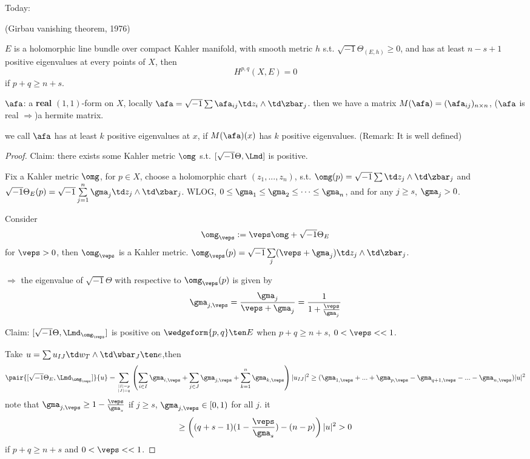 Today:
\begin{thm}(Girbau vanishing theorem, 1976)

$E$ is a holomorphic line bundle over compact Kahler manifold,
with smooth metric $h$ s.t. $\sqrt{-1}\Theta_{(E,h)}\geq 0$,
and has at least $n-s+1$ positive eigenvalues at every points of $X$, then
$$H^{p,q}(X,E)=0$$
if $p+q\geq n+s$.
\end{thm}

$\afa$: a \textbf{real} $(1,1)$-form on $X$,
locally $\afa=\sqrt{-1}\sum\afa_{ij}\td z_i\wedge\td\zbar_j$.
then we have a matrix $M(\afa)=(\afa_{ij})_{n\times n}$,
($\afa$ is real $\Rightarrow$)a hermite matrix.

we call $\afa$ has at least $k$ positive eigenvalues at $x$,
if $M(\afa)(x)$ has $k$ positive eigenvalues.
(Remark: It is well defined)

\begin{proof}
Claim: there exists some Kahler metric $\omg$
s.t. $[\sqrt{-1}\Theta,\Lmd]$ is positive.

Fix a Kahler metric $\omg$,
for $p\in X$, choose a holomorphic chart $(z_1,...,z_n)$,
s.t. $\omg(p)=\sqrt{-1}\sum\td z_j\wedge\td\zbar_j$ and
$\sqrt{-1}\Theta_E(p)=\sqrt{-1}\sum\limits_{j=1}^{n}\gma_j\td z_j\wedge\td\zbar_j$.
WLOG, $0\leq\gma_1\leq\gma_2\leq\cdots\leq\gma_n$,
and for any $j\geq s$, $\gma_j>0$.

Consider
$$\omg_\veps:=\veps\omg+\sqrt{-1}\Theta_E$$
for $\veps>0$, then $\omg_\veps$ is a Kahler metric.
$\omg_\veps(p)=\sqrt{-1}\sum\limits_{j}(\veps+\gma_j)\td z_j\wedge\td\zbar_j$.

$\Rightarrow$ the eigenvalue of $\sqrt{-1}\Theta$ with respective to
$\omg_\veps(p)$ is given by
$$\gma_{j,\veps}=\frac{\gma_j}{\veps+\gma_j}=
\frac{1}{1+\frac{\veps}{\gma_j}}$$

Claim: $[\sqrt{-1}\Theta,\Lmd_{\omg_\veps}]$ is positive on
$\wedgeform{p,q}\ten E$ when $p+q\geq n+s$, $0<\veps<<1$.

Take $u=\sum\limits u_{IJ}\td w_T\wedge\td\wbar_J\ten e$,then
$$
  \pair{[\sqrt{-1}\Theta_E,\Lmd_{\omg_\veps}]}{u}
=
  \sum_{|I|=p\atop|J|=q}
    \left(
      \sum_{i\in I}
        \gma_{i,\veps}
     +\sum_{j\in J}
       \gma_{j,\veps}
     +\sum_{k=1}^{n}
       \gma_{k,\veps}
    \right)
    |u_{IJ}|^2
\geq
  (\gma_{1,\veps}+...+\gma_{p,\veps}-\gma_{q+1,\veps}-...-\gma_{n,\veps})
  |u|^2
$$
note that $\gma_{j,\veps}\geq 1-\frac{\veps}{\gma_s}$
if $j\geq s$, $\gma_{j,\veps}\in[0,1)$ for all $j$. it
$$
\geq
  \left(
    (q+s-1)(1-\frac{\veps}{\gma_s})
   -(n-p)
  \right)
  |u|^2
>0
$$
if $p+q\geq n+s$ and $0<\veps<<1$.
\end{proof}

